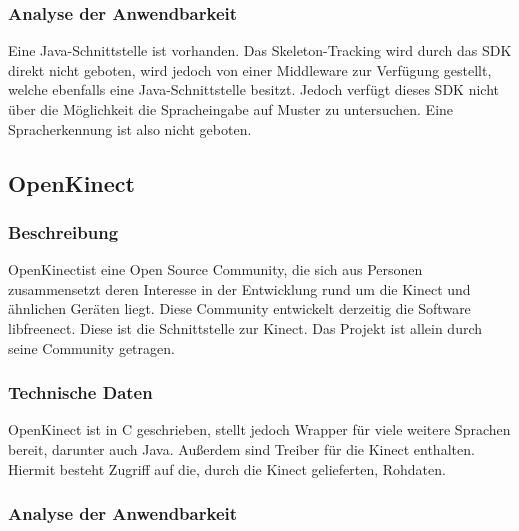 \subsubsection{Analyse der Anwendbarkeit}

Eine Java-Schnittstelle ist vorhanden. Das Skeleton-Tracking wird durch das SDK direkt nicht geboten, wird jedoch von einer Middleware zur Verf\"ugung gestellt, 
welche ebenfalls eine Java-Schnittstelle besitzt. Jedoch verf\"ugt dieses SDK nicht \"uber die M\"oglichkeit die Spracheingabe auf Muster zu untersuchen. Eine Spracherkennung ist also nicht geboten.

\newpage

\subsection{OpenKinect}

\subsubsection{Beschreibung}

OpenKinect\footnotemark[11] ist eine Open Source Community, die sich aus Personen zusammensetzt deren Interesse in der Entwicklung rund um die Kinect und \"ahnlichen Ger\"aten liegt.
Diese Community entwickelt derzeitig die Software libfreenect. Diese ist die Schnittstelle zur Kinect. Das Projekt ist allein durch seine Community getragen.

\subsubsection{Technische Daten}

OpenKinect ist in C geschrieben, stellt jedoch Wrapper f\"ur viele weitere Sprachen bereit\footnotemark[12], darunter auch Java. Außerdem sind Treiber f\"ur die Kinect enthalten.
Hiermit besteht Zugriff auf die, durch die Kinect gelieferten, Rohdaten.


\subsubsection{Analyse der Anwendbarkeit}

